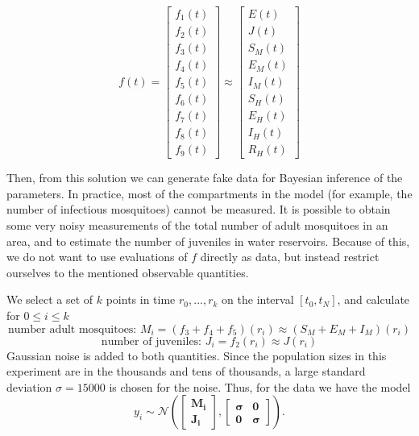 \documentclass{article}
\begin{document}
\[f(t) = \begin{bmatrix}
f_1(t) \\
f_2(t) \\
f_3(t) \\
f_4(t) \\
f_5(t) \\
f_6(t) \\
f_7(t) \\
f_8(t) \\
f_9(t)
\end{bmatrix} \approx \begin{bmatrix}
E(t) \\
J(t) \\
S_M(t) \\
E_M(t) \\
I_M(t) \\
S_H(t) \\
E_H(t) \\
I_H(t) \\
R_H(t)
\end{bmatrix}\]

Then, from this solution we can generate fake data for Bayesian inference of the parameters. 
In practice, most of the compartments in the model (for example, the number of infectious mosquitoes) cannot be measured. It is possible to obtain some very noisy measurements of the total number of adult mosquitoes in an area, and to estimate the number of juveniles in water reservoirs.
Because of this, we do not want to use evaluations of $f$ directly as data, but instead restrict ourselves to the mentioned observable quantities.

We select a set of $k$ points in time $r_0,...,r_k$ on the interval $[t_0,t_N]$, and calculate for $0\leq i \leq k$
\[\text{number adult mosquitoes: }M_i = (f_3+f_4+f_5)(r_i) \approx (S_M + E_M + I_M)(r_i)\]
\[\text{number of juveniles: } J_i = f_2(r_i) \approx J(r_i)\]
Gaussian noise is added to both quantities. Since the population sizes in this experiment are in the thousands and tens of thousands, a large standard deviation $\sigma = 15000$ is chosen for the noise.
Thus, for the data we have the model
\[y_i \sim \mathcal{N}(\boldsymbol{\begin{bmatrix}
M_i \\
J_i 
\end{bmatrix}}, 
\boldsymbol{\begin{bmatrix}
\sigma & 0 \\
0 & \sigma
\end{bmatrix}}).\]
\end{document}
